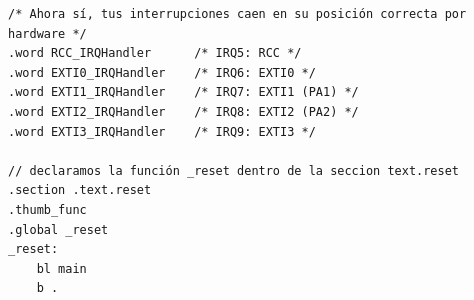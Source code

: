 \begin{lstlisting}[language=MyMake]
/* Ahora sí, tus interrupciones caen en su posición correcta por hardware */
.word RCC_IRQHandler      /* IRQ5: RCC */
.word EXTI0_IRQHandler    /* IRQ6: EXTI0 */
.word EXTI1_IRQHandler    /* IRQ7: EXTI1 (PA1) */
.word EXTI2_IRQHandler    /* IRQ8: EXTI2 (PA2) */
.word EXTI3_IRQHandler    /* IRQ9: EXTI3 */

// declaramos la función _reset dentro de la seccion text.reset
.section .text.reset
.thumb_func
.global _reset
_reset:
    bl main
    b .
\end{lstlisting}